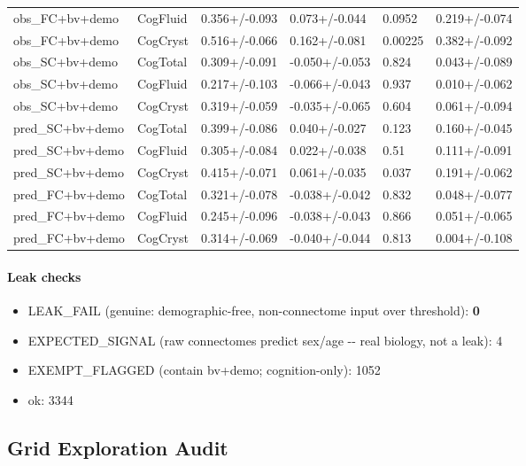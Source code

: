 {\begin{longtable}[]{@{}llllll@{}}
obs\_FC+bv+demo & CogFluid & 0.356+/-0.093 & 0.073+/-0.044 & 0.0952 & 0.219+/-0.074 \\
obs\_FC+bv+demo & CogCryst & 0.516+/-0.066 & 0.162+/-0.081 & 0.00225 & 0.382+/-0.092 \\
obs\_SC+bv+demo & CogTotal & 0.309+/-0.091 & -0.050+/-0.053 & 0.824 & 0.043+/-0.089 \\
obs\_SC+bv+demo & CogFluid & 0.217+/-0.103 & -0.066+/-0.043 & 0.937 & 0.010+/-0.062 \\
obs\_SC+bv+demo & CogCryst & 0.319+/-0.059 & -0.035+/-0.065 & 0.604 & 0.061+/-0.094 \\
pred\_SC+bv+demo & CogTotal & 0.399+/-0.086 & 0.040+/-0.027 & 0.123 & 0.160+/-0.045 \\
pred\_SC+bv+demo & CogFluid & 0.305+/-0.084 & 0.022+/-0.038 & 0.51 & 0.111+/-0.091 \\
pred\_SC+bv+demo & CogCryst & 0.415+/-0.071 & 0.061+/-0.035 & 0.037 & 0.191+/-0.062 \\
pred\_FC+bv+demo & CogTotal & 0.321+/-0.078 & -0.038+/-0.042 & 0.832 & 0.048+/-0.077 \\
pred\_FC+bv+demo & CogFluid & 0.245+/-0.096 & -0.038+/-0.043 & 0.866 & 0.051+/-0.065 \\
pred\_FC+bv+demo & CogCryst & 0.314+/-0.069 & -0.040+/-0.044 & 0.813 & 0.004+/-0.108 \\
\end{longtable}
}

\paragraph{Leak checks}\label{leak-checks}

\begin{itemize}
\tightlist
\item
  LEAK\_FAIL (genuine: demographic-free, non-connectome input over threshold): \textbf{0}
\item
  EXPECTED\_SIGNAL (raw connectomes predict sex/age -\/- real biology, not a leak): 4
\item
  EXEMPT\_FLAGGED (contain bv+demo; cognition-only): 1052
\item
  ok: 3344
\end{itemize}

\subsection{Grid Exploration Audit}\label{grid-exploration-audit}

